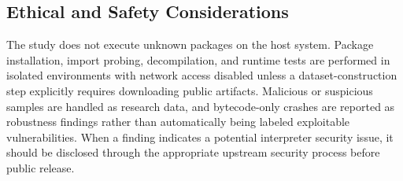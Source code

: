 \subsection{Ethical and Safety Considerations}\label{sec:method:ethics}

The study does not execute unknown packages on the host system.  Package installation, import probing, decompilation, and runtime tests are performed in isolated environments with network access disabled unless a dataset-construction step explicitly requires downloading public artifacts.  Malicious or suspicious samples are handled as research data, and bytecode-only crashes are reported as robustness findings rather than automatically being labeled exploitable vulnerabilities.  When a finding indicates a potential interpreter security issue, it should be disclosed through the appropriate upstream security process before public release.
